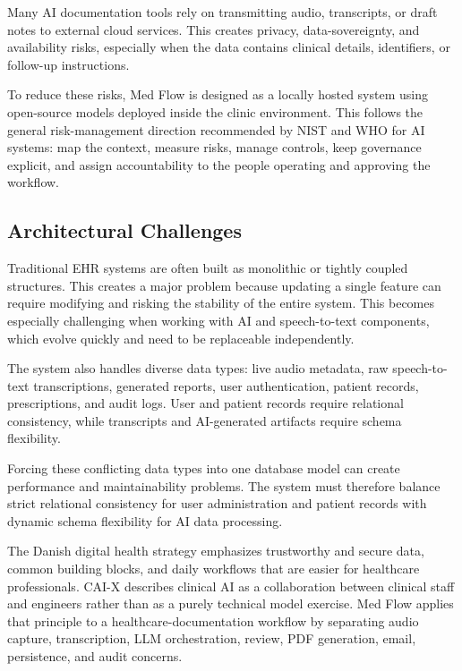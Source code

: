 Many AI documentation tools rely on transmitting audio, transcripts, or draft notes to external cloud services. This creates privacy, data-sovereignty, and availability risks, especially when the data contains clinical details, identifiers, or follow-up instructions.

To reduce these risks, Med Flow is designed as a locally hosted system using open-source models deployed inside the clinic environment. This follows the general risk-management direction recommended by NIST and WHO for AI systems: map the context, measure risks, manage controls, keep governance explicit, and assign accountability to the people operating and approving the workflow.

\subsection{Architectural Challenges}
\label{subsec:architectural-challenges}

Traditional EHR systems are often built as monolithic or tightly coupled structures. This creates a major problem because updating a single feature can require modifying and risking the stability of the entire system. This becomes especially challenging when working with AI and speech-to-text components, which evolve quickly and need to be replaceable independently.

The system also handles diverse data types: live audio metadata, raw speech-to-text transcriptions, generated reports, user authentication, patient records, prescriptions, and audit logs. User and patient records require relational consistency, while transcripts and AI-generated artifacts require schema flexibility.

Forcing these conflicting data types into one database model can create performance and maintainability problems. The system must therefore balance strict relational consistency for user administration and patient records with dynamic schema flexibility for AI data processing.

The Danish digital health strategy emphasizes trustworthy and secure data, common building blocks, and daily workflows that are easier for healthcare professionals. CAI-X describes clinical AI as a collaboration between clinical staff and engineers rather than as a purely technical model exercise. Med Flow applies that principle to a healthcare-documentation workflow by separating audio capture, transcription, LLM orchestration, review, PDF generation, email, persistence, and audit concerns.

